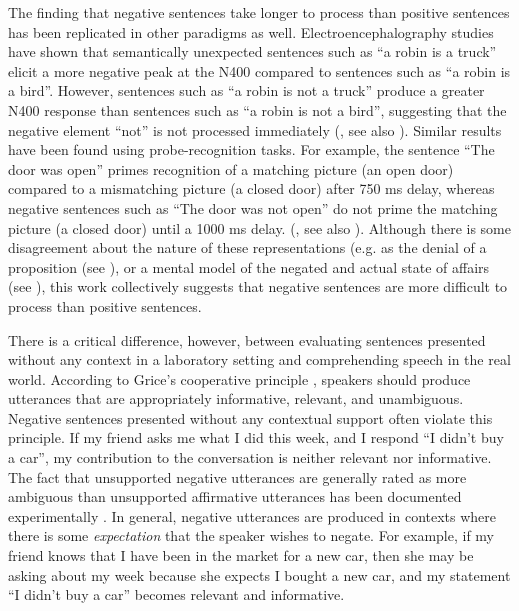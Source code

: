 \documentclass[10pt,letterpaper]{article}
\begin{document}
The finding that negative sentences take longer to process than positive sentences has been replicated in other paradigms as well.  Electroencephalography studies have shown that semantically unexpected sentences such as ``a robin is a truck'' elicit a more negative peak at the N400 compared to sentences such as ``a robin is a bird''.  However, sentences such as ``a robin is not a truck'' produce a greater N400 response than sentences such as ``a robin is not a bird'', suggesting that the negative element ``not'' is not processed immediately (, see also ).  Similar results have been found using probe-recognition tasks.  For example, the sentence ``The door was open'' primes recognition of  a matching picture (an open door) compared to a mismatching picture (a closed door) after 750 ms delay, whereas negative sentences such as ``The door was not open'' do not prime the matching picture (a closed door) until a 1000 ms delay.  (, see also ).  Although there is some disagreement about the nature of these representations (e.g. as the denial of a proposition (see ), or a mental model of the negated and actual state of affairs (see ), this work collectively suggests that negative sentences are more difficult to process than positive sentences.  
  
There is a critical difference, however, between evaluating sentences presented without any context in a laboratory setting and comprehending speech in the real world. According to Grice's cooperative principle \cite{grice1975}, speakers should produce utterances that are appropriately informative, relevant, and unambiguous.  Negative sentences presented without any contextual support often violate this principle.  If my friend asks me what I did this week, and I respond ``I didn't buy a car'', my contribution to the conversation is neither relevant nor informative.  The fact that unsupported negative utterances are generally rated as more ambiguous than unsupported affirmative utterances has been documented experimentally \cite{glenberg1999}.  In general, negative utterances are produced in contexts where there is some \emph{expectation} that the speaker wishes to negate.  For example, if my friend knows that I have been in the market for a new car, then she may be asking about my week because she expects I bought a new car, and my statement ``I didn't buy a car'' becomes relevant and informative.  
\end{document}
